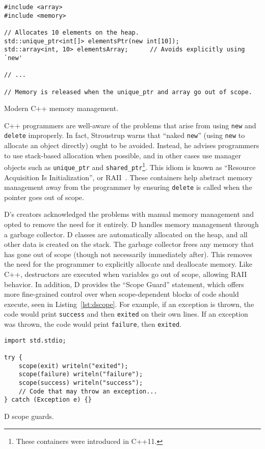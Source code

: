 \documentclass[draftcopy,nolof,nolot]{srpaper}
\begin{document}
\begin{listing}
\begin{verbatim}
#include <array>
#include <memory>

// Allocates 10 elements on the heap.
std::unique_ptr<int[]> elementsPtr(new int[10]);
std::array<int, 10> elementsArray;      // Avoids explicitly using `new'

// ...

// Memory is released when the unique_ptr and array go out of scope.
\end{verbatim}
\label{lst:cppmodernmemory}
\caption{Modern C++ memory management.}
\end{listing}

C++ programmers are well-aware of the problems that arise from using
\texttt{new} and \texttt{delete} improperly. In fact, Stroustrup warns that
``naked \texttt{new}'' (using \texttt{new} to allocate an object directly)
ought to be avoided. Instead, he advises programmers to use stack-based
allocation when possible, and in other cases use manager objects such as
\texttt{unique\_ptr} and \texttt{shared\_ptr}\footnote{These containers were
    introduced in C++11.}. This idiom is known as ``Resource Acquisition Is
Initialization'', or RAII~\cite{stroustrup2013the}. These containers help
abstract memory management away from the programmer by ensuring \texttt{delete}
is called when the pointer goes out of scope.

D's creators acknowledged the problems with manual memory management and opted
to remove the need for it entirely. D handles memory management through a
garbage collector. D classes are automatically allocated on the heap, and all
other data is created on the stack. The garbage collector frees any memory that
has gone out of scope (though not necessarily immediately after). This removes
the need for the programmer to explicitly allocate and deallocate memory. Like
C++, destructors are executed when variables go out of scope, allowing RAII
behavior. In addition, D provides the ``Scope Guard'' statement, which offers
more fine-grained control over when scope-dependent blocks of code should
execute, seen in Listing~\ref{lst:dscope}. For example, if an exception is
thrown, the code would print \texttt{success} and then \texttt{exited} on their
own lines. If an exception was thrown, the code would print \texttt{failure},
then \texttt{exited}.

\begin{listing}[H]
\begin{verbatim}
import std.stdio;

try {
    scope(exit) writeln("exited");
    scope(failure) writeln("failure");
    scope(success) writeln("success");
    // Code that may throw an exception...
} catch (Exception e) {}
\end{verbatim}
\caption{D scope guards.}
\label{lst:dscope}
\end{listing}
\end{document}
